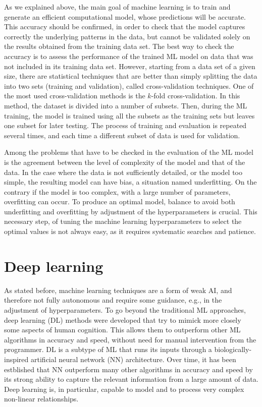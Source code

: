 \documentclass[aip,apm,amsmath,amssymb,reprint]{revtex4-2}
\begin{document}
As we explained above, the main goal of machine learning is to train and generate an efficient computational model, whose predictions will be accurate. This accuracy should be confirmed, in order to check that the model captures correctly the underlying patterns in the data, but cannot be validated solely on the results obtained from the training data set. The best way to check the accuracy is to assess the performance of the trained ML model on data that was not included in its training data set. However, starting from a data set of a given size, there are statistical techniques that are better than simply splitting the data into two sets (training and  validation), called cross-validation techniques. One of the most used cross-validation methods is the $k$-fold cross-validation. In this method, the dataset is divided into a number of subsets. Then, during the ML training, the model is trained using all the subsets as the training sets but leaves one subset for later testing. The process of training and evaluation is repeated several times, and each time a different subset of data is used for validation.

Among the problems that have to be checked in the evaluation of the ML model is the agreement between the level of complexity of the model and that of the data. In the case where the data is not sufficiently detailed, or the model too simple, the resulting model can have bias, a situation named underfitting. On the contrary if the model is too complex, with a large number of parameters, overfitting can occur. To produce an optimal model, balance to avoid both underfitting and overfitting by adjustment of the hyperparameters is crucial. This necessary step, of tuning the machine learning hyperparameters to select the optimal values is not always easy, as it requires systematic searches and patience.


\section{Deep learning}

As stated before, machine learning techniques are a form of weak AI, and therefore not fully autonomous and require some guidance, e.g., in the adjustment of hyperparameters. To go beyond the traditional ML approaches, deep learning (DL) methods were developed that try to mimick more closely some aspects of human cognition. This allows them to outperform other ML algorithms in accuracy and speed, without need for manual intervention from the programmer. DL is a subtype of ML that runs its inputs through a biologically-inspired artificial neural network (NN) architecture. Over time, it has been estblished that NN outperform many other algorithms in accuracy and speed by its strong ability to capture the relevant information from a large amount of data. Deep learning is, in particular, capable to model and to process very complex non-linear relationships.
\end{document}
